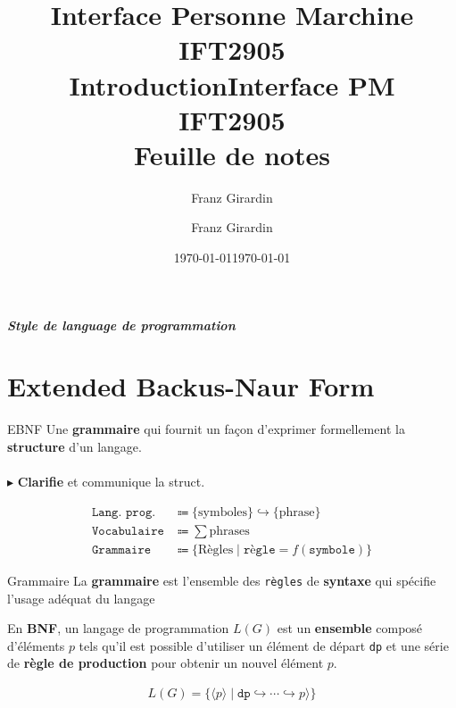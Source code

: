 \documentclass{report}
\title{\Huge{Interface Personne Marchine}\\{IFT2905}\\{\textbf{Introduction}}}
\author{\huge{Franz Girardin}}
\date{\today}
\title{\Huge{Interface PM}\\{IFT2905}\\{\textbf{Feuille de notes}}}
\author{\huge{Franz Girardin}}
\date{\today}
\begin{document}
\maketitle
\pagebreak
\tableofcontents
\pagebreak
\begin{multicols*}{3}


    \footnotesize
    \paragraph{Style de language de programmation} 

    \chapter{Extended Backus-Naur Form}

\begin{Definitionx}{EBNF}{}
  Une \textbf{grammaire} qui fournit un façon d'exprimer formellement 
  la \textbf{structure} d'un langage. 
  \mbox{}
  \\ \\ 
  $\blacktriangleright$  \textbf{ Clarifie} et communique la struct. 
\end{Definitionx}


\begin{align*}
  \texttt{Lang. prog. } & \Coloneqq \bigl\{\text{symboles} \bigr\}   
  \hookrightarrow \bigl\{ \text{phrase} \bigr\} 
  \\
  \texttt{Vocabulaire} & \Coloneqq \sum \text{phrases}
  \\
  \texttt{Grammaire} & \Coloneqq \bigl\{ \text{Règles} \; \big| \;
              \texttt{règle} = f(\texttt{symbole})  \bigr\}
\end{align*}      

\begin{Definitionx}{Grammaire}{}
    La \textbf{grammaire} est l'ensemble des \texttt{règles} 
    de \textbf{syntaxe} qui spécifie l'usage adéquat du langage   
\end{Definitionx}

En \textbf{BNF},   un langage de programmation $L(G)$ est un 
\textbf{ensemble} composé d'éléments $p$ tels 
qu'il est possible d'utiliser un élément de départ 
\texttt{dp} et une série de \textbf{règle de production} 
pour obtenir un nouvel élément $p$. 

\begin{align*}
    L(G) = \bigl\{ \langle p \rangle \; | \; \texttt{dp}    
              \hookrightarrow \cdots \hookrightarrow p
    \rangle  \bigr\}
\end{align*}


\end{multicols*}
\end{document}
